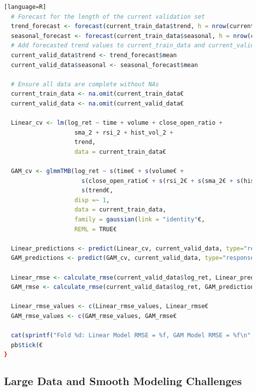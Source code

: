 \documentclass[12pt, twoside,hidelinks]{article}
\theoremstyle{definition}
\numberwithin{equation}{section}
\begin{document}
\begin{lstlisting}[language=R][language=R]
  # Forecast for the length of the current validation set
  trend_forecast <- forecast(current_train_data$trend, h = nrow(current_valid_data€€
  seasonal_forecast <- forecast(current_train_data$seasonal, h = nrow(current_valid_data€€
  # Add forecasted trend values to current_train_data and current_valid_data
  current_valid_data$trend <- trend_forecast$mean  
  current_valid_data$seasonal <- seasonal_forecast$mean

  # Ensure all data are complete without NAs
  current_train_data <- na.omit(current_train_data€
  current_valid_data <- na.omit(current_valid_data€
  
  Linear_cv <- lm(log_ret ~ time + volume + close_open_ratio + 
                    sma_2 + rsi_2 + hist_vol_2 +
                    trend, 
                    data = current_train_data€
  
  GAM_cv <- glmmTMB(log_ret ~ s(time€ + s(volume€ + 
                      s(close_open_ratio€ + s(rsi_2€ + s(sma_2€ + s(hist_vol_2€ +
                      s(trend€,
                    disp =~ 1,
                    data = current_train_data,
                    family = gaussian(link = "identity"€,
                    REML = TRUE€
  
  Linear_predictions <- predict(Linear_cv, current_valid_data, type="response"€
  GAM_predictions <- predict(GAM_cv, current_valid_data, type="response", allow.new.levels = TRUE€
  
  Linear_rmse <- calculate_rmse(current_valid_data$log_ret, Linear_predictions€
  GAM_rmse <- calculate_rmse(current_valid_data$log_ret, GAM_predictions€
  
  Linear_rmse_values <- c(Linear_rmse_values, Linear_rmse€
  GAM_rmse_values <- c(GAM_rmse_values, GAM_rmse€
  
  cat(sprintf("Fold %d: Linear Model RMSE = %f, GAM Model RMSE = %f\n", i, Linear_rmse, GAM_rmse€€
  pb$tick(€
}
\end{lstlisting}


\subsection{Large Data and Smooth Modeling Challenges}\label{app:domains:bigdata}
\end{document}
